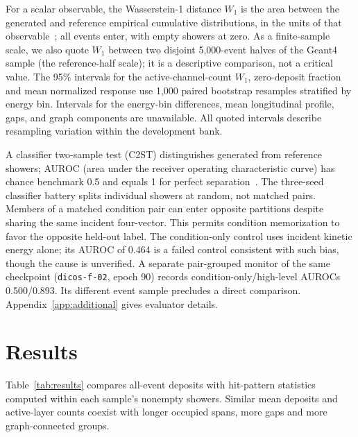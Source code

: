 \documentclass[10pt]{article}
\begin{document}
For a scalar observable, the Wasserstein-1 distance $W_1$ is the area between the generated and reference empirical cumulative distributions, in the units of that observable~\cite{kansalmetrics}; all events enter, with empty showers at zero. As a finite-sample scale, we also quote $W_1$ between two disjoint 5,000-event halves of the Geant4 sample (the reference-half scale); it is a descriptive comparison, not a critical value. The 95\% intervals for the active-channel-count $W_1$, zero-deposit fraction and mean normalized response use 1,000 paired bootstrap resamples stratified by energy bin. Intervals for the energy-bin differences, mean longitudinal profile, gaps, and graph components are unavailable. All quoted intervals describe resampling variation within the development bank.

A classifier two-sample test (C2ST) distinguishes generated from reference showers; AUROC (area under the receiver operating characteristic curve) has chance benchmark 0.5 and equals 1 for perfect separation~\cite{c2st,kansalmetrics}. The three-seed classifier battery splits individual showers at random, not matched pairs. Members of a matched condition pair can enter opposite partitions despite sharing the same incident four-vector. This permits condition memorization to favor the opposite held-out label. The condition-only control uses incident kinetic energy alone; its AUROC of 0.464 is a failed control consistent with such bias, though the cause is unverified. A separate pair-grouped monitor of the same checkpoint (\texttt{dicos-f-02}, epoch 90) records condition-only/high-level AUROCs 0.500/0.893. Its different event sample precludes a direct comparison. Appendix~\ref{app:additional} gives evaluator details.

\section{Results}
\label{sec:results}

Table~\ref{tab:results} compares all-event deposits with hit-pattern statistics computed within each sample's nonempty showers. Similar mean deposits and active-layer counts coexist with longer occupied spans, more gaps and more graph-connected groups.
\end{document}
